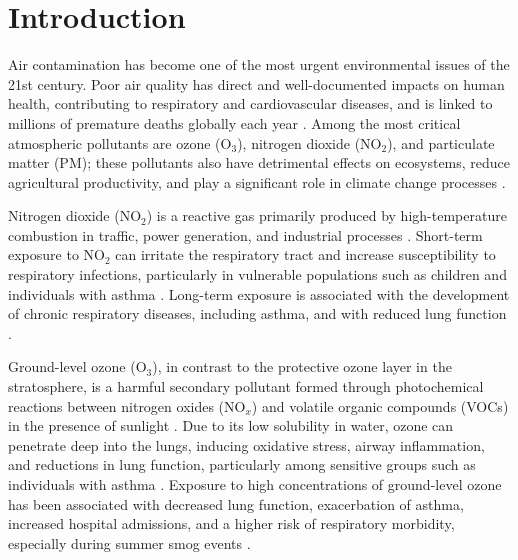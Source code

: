 \chapter[Introduction]{Introduction}
\label{chap:intro}





Air contamination has become one of the most urgent environmental issues of the 21st century. Poor air quality has direct and well-documented impacts on human health, contributing to respiratory and cardiovascular diseases, and is linked to millions of premature deaths globally each year \cite{kim2020cumulative}. Among the most critical atmospheric pollutants are ozone (O$_3$), nitrogen dioxide (NO$_2$), and particulate matter (PM)\cite{ fuzzi2015particulate}; these pollutants also have detrimental effects on ecosystems, reduce agricultural productivity\cite{zhou2018impact}, and play a significant role in climate change processes \cite{watson2016impact}.

Nitrogen dioxide (NO$_2$) is a reactive gas primarily produced by high-temperature combustion in traffic, power generation, and industrial processes \cite{whoTypesPollutants}. Short-term exposure to NO$_2$ can irritate the respiratory tract and increase susceptibility to respiratory infections, particularly in vulnerable populations such as children and individuals with asthma \cite{cao2025short}. Long-term exposure is associated with the development of chronic respiratory diseases, including asthma, and with reduced lung function \cite{liu2021long}.


Ground-level ozone (O$_3$), in contrast to the protective ozone layer in the stratosphere, is a harmful secondary pollutant formed through photochemical reactions between nitrogen oxides (NO$_x$) and volatile organic compounds (VOCs) in the presence of sunlight \cite{whoTypesPollutants}. 
Due to its low solubility in water, ozone can penetrate deep into the lungs, inducing oxidative stress, airway inflammation, and reductions in lung function, particularly among sensitive groups such as individuals with asthma \cite{tiotiu2020impact}. 
Exposure to high concentrations of ground-level ozone has been associated with decreased lung function, exacerbation of asthma, increased hospital admissions, and a higher risk of respiratory morbidity, especially during summer smog events \cite{zheng2021short}.

